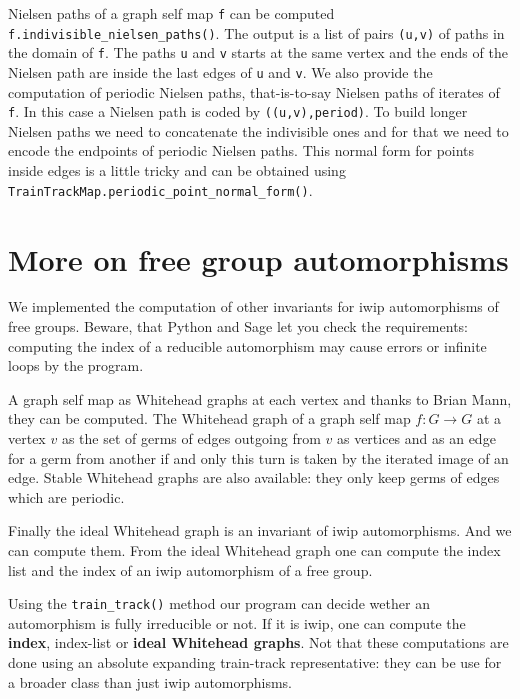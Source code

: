 \documentclass[10pt,a4paper]{article}
\begin{document}
Nielsen paths of a graph self map \texttt{f} can be computed
\texttt{f.indivisible\_nielsen\_paths()}. The output is a list of pairs
\texttt{(u,v)} of paths in the domain of \texttt{f}. The paths
\texttt{u} and \texttt{v} starts at the same vertex and the ends of
the Nielsen path are inside the last edges of \texttt{u} and
\texttt{v}. We also provide the computation of periodic Nielsen
paths, that-is-to-say Nielsen paths of
iterates of \texttt{f}. In this case a Nielsen path is coded by
\texttt{((u,v),period)}. To build longer Nielsen paths we need to
concatenate the indivisible ones and for that we need to encode the
endpoints of periodic Nielsen paths. This normal form for points
inside edges is a little tricky and can be obtained using
\texttt{TrainTrackMap.periodic\_point\_normal\_form()}.


\section{More on free group automorphisms}

We implemented the computation of other invariants for iwip
automorphisms of free groups. Beware, that Python and Sage let you
check the requirements: computing the index of a reducible
automorphism may cause errors or infinite loops by the program.

A graph self map as Whitehead graphs at each
vertex and thanks to Brian Mann, they can be computed. The Whitehead
graph of a graph self map $f:G\to G$
at a vertex $v$
as the set of germs of edges outgoing from $v$
as vertices and as an edge for a germ from another if and only this
turn is taken by the iterated image of an edge. Stable Whitehead
graphs are also available: they only keep germs of edges which are periodic.

Finally the ideal Whitehead graph is an
invariant of iwip automorphisms. And we can compute them. From the
ideal Whitehead graph one can compute the index list and the index of
an iwip automorphism of a free group.

Using the \texttt{train\_track()} method our program can decide wether
an automorphism is fully irreducible or not. If it is iwip,
one can compute the \textbf{index}, index-list or \textbf{ideal
  Whitehead graphs}. Not that these computations are done using an
absolute expanding train-track representative: they can be use for a
broader class than just iwip automorphisms.
\end{document}
